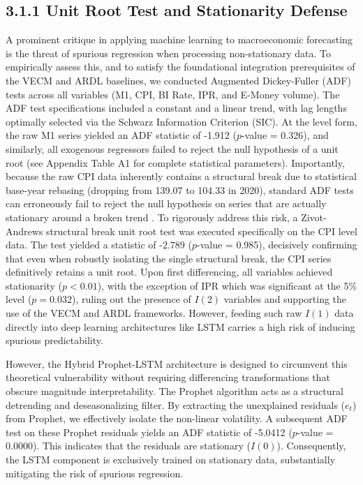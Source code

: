 \documentclass[12pt, letterpaper]{article}
\begin{document}
\subsection*{3.1.1 Unit Root Test and Stationarity Defense}
A prominent critique in applying machine learning to macroeconomic forecasting is the threat of spurious regression when processing non-stationary data. To empirically assess this, and to satisfy the foundational integration prerequisites of the VECM and ARDL baselines, we conducted Augmented Dickey-Fuller (ADF) tests across all variables (M1, CPI, BI Rate, IPR, and E-Money volume). The ADF test specifications included a constant and a linear trend, with lag lengths optimally selected via the Schwarz Information Criterion (SIC). At the level form, the raw M1 series yielded an ADF statistic of -1.912 ($p$-value = 0.326), and similarly, all exogenous regressors failed to reject the null hypothesis of a unit root (see Appendix Table A1 for complete statistical parameters). Importantly, because the raw CPI data inherently contains a structural break due to statistical base-year rebasing (dropping from 139.07 to 104.33 in 2020), standard ADF tests can erroneously fail to reject the null hypothesis on series that are actually stationary around a broken trend \citep{Perron1989}. To rigorously address this risk, a Zivot-Andrews structural break unit root test was executed specifically on the CPI level data. The test yielded a statistic of -2.789 ($p$-value = 0.985), decisively confirming that even when robustly isolating the single structural break, the CPI series definitively retains a unit root. Upon first differencing, all variables achieved stationarity ($p < 0.01$), with the exception of IPR which was significant at the 5\% level ($p = 0.032$), ruling out the presence of $I(2)$ variables and supporting the use of the VECM and ARDL frameworks. However, feeding such raw $I(1)$ data directly into deep learning architectures like LSTM carries a high risk of inducing spurious predictability.

However, the Hybrid Prophet-LSTM architecture is designed to circumvent this theoretical vulnerability without requiring differencing transformations that obscure magnitude interpretability. The Prophet algorithm acts as a structural detrending and deseasonalizing filter. By extracting the unexplained residuals ($e_t$) from Prophet, we effectively isolate the non-linear volatility. A subsequent ADF test on these Prophet residuals yields an ADF statistic of -5.0412 ($p$-value = 0.0000). This indicates that the residuals are stationary ($I(0)$). Consequently, the LSTM component is exclusively trained on stationary data, substantially mitigating the risk of spurious regression.
\end{document}
